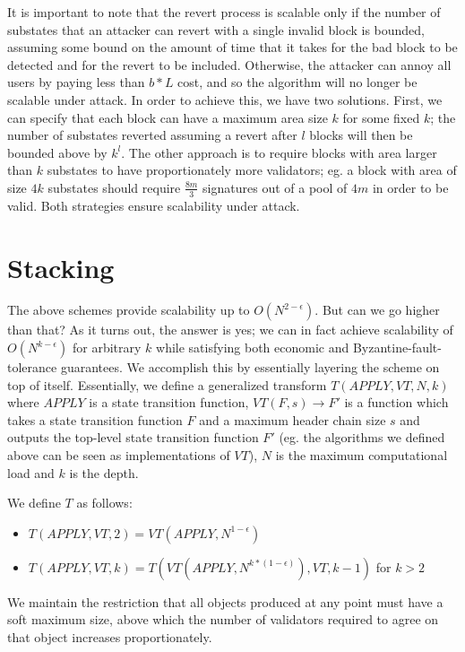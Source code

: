 \documentclass[11pt,a4paper]{report}
\theoremstyle{plain}
\theoremstyle{definition}
\theoremstyle{remark}
\begin{document}
It is important to note that the revert process is scalable only if the number of substates that an attacker can revert with a single invalid block is bounded, assuming some bound on the amount of time that it takes for the bad block to be detected and for the revert to be included. Otherwise, the attacker can annoy all users by paying less than $b * L$ cost, and so the algorithm will no longer be scalable under attack. In order to achieve this, we have two solutions. First, we can specify that each block can have a maximum area size $k$ for some fixed $k$; the number of substates reverted assuming a revert after $l$ blocks will then be bounded above by $k^l$. The other approach is to require blocks with area larger than $k$ substates to have proportionately more validators; eg. a block with area of size $4k$ substates should require $\frac{8m}{3}$ signatures out of a pool of $4m$ in order to be valid. Both strategies ensure scalability under attack.

\chapter{Stacking}

The above schemes provide scalability up to $O(N^{2-\epsilon})$. But can we go higher than that? As it turns out, the answer is yes; we can in fact achieve scalability of $O(N^{k-\epsilon})$ for arbitrary $k$ while satisfying both economic and Byzantine-fault-tolerance guarantees. We accomplish this by essentially layering the scheme on top of itself. Essentially, we define a generalized transform $T(APPLY, VT, N, k)$ where $APPLY$ is a state transition function, $VT(F, s) \rightarrow F'$ is a function which takes a state transition function $F$ and a maximum header chain size $s$ and outputs the top-level state transition function $F'$ (eg. the algorithms we defined above can be seen as implementations of $VT$), $N$ is the maximum computational load and $k$ is the depth.

We define $T$ as follows:

\begin{itemize}
\item
$T(APPLY, VT, 2) = VT(APPLY, N^{1-\epsilon})$
\item
$T(APPLY, VT, k) = T(VT(APPLY, N^{k*(1-\epsilon)}), VT, k-1)$ for $k > 2$
\end{itemize}

We maintain the restriction that all objects produced at any point must have a soft maximum size, above which the number of validators required to agree on that object increases proportionately.
\end{document}
